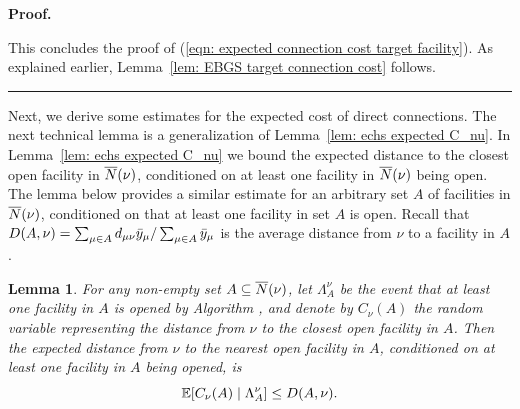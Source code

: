 \documentclass[oneside,final]{ucr}
\newtheorem{lemma}[theorem]{Lemma}
\newenvironment{proof}[1][Proof]{\textbf{#1.} }{\ \rule{0.5em}{0.5em}}
\begin{document}
\begin{proof}
\begin{description}
\end{description}

This concludes the proof of (\ref{eqn: expected connection
  cost target facility}).  As explained earlier,
Lemma~\ref{lem: EBGS target connection cost} follows.
\end{proof}

Next, we derive some estimates for the expected cost of direct
connections.  The next technical lemma is a generalization of
Lemma~\ref{lem: echs expected C_nu}. In Lemma~\ref{lem: echs expected
  C_nu} we bound the expected distance to the closest open facility in
${\overline{N}}(\nu)$, conditioned on at least one facility in ${\overline{N}}(\nu)$
being open. The lemma below provides a similar estimate for an
arbitrary set $A$ of facilities in ${\overline{N}}(\nu)$, conditioned on that
at least one facility in set $A$ is open.  Recall that $D(A,\nu) =
\sum_{\mu \in A} d_{\mu\nu} {\bar y}_{\mu} / \sum_{\mu \in A}
{\bar y}_{\mu}$ is the average distance from $\nu$ to a facility in $A$. 


\begin{lemma}\label{lem: expected distance in EBGS}
  For any non-empty set $A\subseteq {\overline{N}}(\nu)$, let $\Lambda^\nu_A$ be
  the event that at least one facility in $A$ is opened by Algorithm
  {\EBGS}, and denote by $C_\nu(A)$ the random variable representing
  the distance from $\nu$ to the closest open facility in $A$.  Then
  the expected distance from $\nu$ to the nearest open facility in
  $A$, conditioned on at least one facility in $A$ being opened, is
%
\begin{equation*}
	\mathbb{E}[C_\nu(A) \mid \Lambda^\nu_A ] \le D(A,\nu).
\end{equation*}
\end{lemma}
\end{document}
